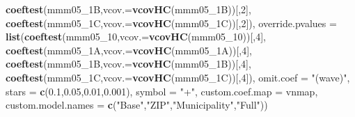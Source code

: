\documentclass[
]{article}
\newenvironment{Shaded}{\begin{snugshade}}{\end{snugshade}}
\newcommand{\DataTypeTok}[1]{\textcolor[rgb]{0.13,0.29,0.53}{#1}}
\newcommand{\DecValTok}[1]{\textcolor[rgb]{0.00,0.00,0.81}{#1}}
\newcommand{\FloatTok}[1]{\textcolor[rgb]{0.00,0.00,0.81}{#1}}
\newcommand{\KeywordTok}[1]{\textcolor[rgb]{0.13,0.29,0.53}{\textbf{#1}}}
\newcommand{\NormalTok}[1]{#1}
\newcommand{\StringTok}[1]{\textcolor[rgb]{0.31,0.60,0.02}{#1}}
\begin{document}
\begin{Shaded}
\begin{Highlighting}[]
                             \KeywordTok{coeftest}\NormalTok{(mmm05_1B,}\DataTypeTok{vcov.=}\KeywordTok{vcovHC}\NormalTok{(mmm05_1B))[,}\DecValTok{2}\NormalTok{],}
                             \KeywordTok{coeftest}\NormalTok{(mmm05_1C,}\DataTypeTok{vcov.=}\KeywordTok{vcovHC}\NormalTok{(mmm05_1C))[,}\DecValTok{2}\NormalTok{]),}
          \DataTypeTok{override.pvalues =} \KeywordTok{list}\NormalTok{(}\KeywordTok{coeftest}\NormalTok{(mmm05_}\DecValTok{10}\NormalTok{,}\DataTypeTok{vcov.=}\KeywordTok{vcovHC}\NormalTok{(mmm05_}\DecValTok{10}\NormalTok{))[,}\DecValTok{4}\NormalTok{],}
                                  \KeywordTok{coeftest}\NormalTok{(mmm05_1A,}\DataTypeTok{vcov.=}\KeywordTok{vcovHC}\NormalTok{(mmm05_1A))[,}\DecValTok{4}\NormalTok{],}
                                  \KeywordTok{coeftest}\NormalTok{(mmm05_1B,}\DataTypeTok{vcov.=}\KeywordTok{vcovHC}\NormalTok{(mmm05_1B))[,}\DecValTok{4}\NormalTok{],}
                                  \KeywordTok{coeftest}\NormalTok{(mmm05_1C,}\DataTypeTok{vcov.=}\KeywordTok{vcovHC}\NormalTok{(mmm05_1C))[,}\DecValTok{4}\NormalTok{]),}
          \DataTypeTok{omit.coef =} \StringTok{"(wave)"}\NormalTok{, }\DataTypeTok{stars =} \KeywordTok{c}\NormalTok{(}\FloatTok{0.1}\NormalTok{,}\FloatTok{0.05}\NormalTok{,}\FloatTok{0.01}\NormalTok{,}\FloatTok{0.001}\NormalTok{), }\DataTypeTok{symbol =} \StringTok{"+"}\NormalTok{,}
          \DataTypeTok{custom.coef.map =}\NormalTok{ vnmap, }
          \DataTypeTok{custom.model.names =} \KeywordTok{c}\NormalTok{(}\StringTok{"Base"}\NormalTok{,}\StringTok{"ZIP"}\NormalTok{,}\StringTok{"Municipality"}\NormalTok{,}\StringTok{"Full"}\NormalTok{))}
\end{Highlighting}
\end{Shaded}
\end{document}
